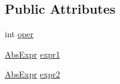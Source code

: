 \subsection*{Public Attributes}
\begin{DoxyCompactItemize}
\item 
int \hyperlink{classcompiler_1_1abstr_1_1tree_1_1expr_1_1_abs_bin_expr_ab555bbd61a58b1bbe86fec80c1bf137f}{oper}
\item 
\hyperlink{classcompiler_1_1abstr_1_1tree_1_1expr_1_1_abs_expr}{Abs\+Expr} \hyperlink{classcompiler_1_1abstr_1_1tree_1_1expr_1_1_abs_bin_expr_a90e9b5a2604ab33a2960cc35720ca57e}{expr1}
\item 
\hyperlink{classcompiler_1_1abstr_1_1tree_1_1expr_1_1_abs_expr}{Abs\+Expr} \hyperlink{classcompiler_1_1abstr_1_1tree_1_1expr_1_1_abs_bin_expr_afd0f06a304d0de88acde89b2f832171c}{expr2}
\end{DoxyCompactItemize}
